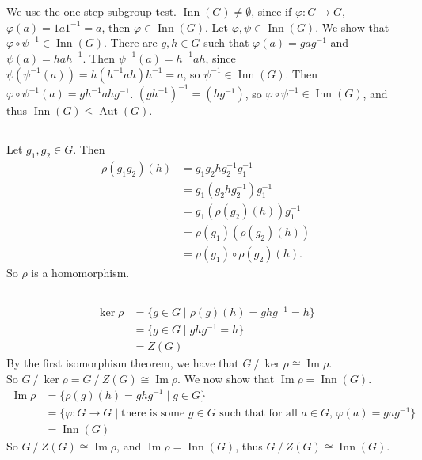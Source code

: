 \documentclass[11pt]{article}
\DeclareMathOperator{\im}{Im}
\DeclareMathOperator{\Inn}{Inn}
\DeclareMathOperator{\Aut}{Aut}
\begin{document}
\section{} %
\subsection{} %
We use the one step subgroup test.
\newline
\newline
$\Inn(G)\neq\emptyset$, since if $\varphi:G\rightarrow G$,
$\varphi(a)=1a1^{-1}=a$, then $\varphi\in\Inn(G)$.
\newline
\newline
Let $\varphi,\psi\in\Inn(G)$. We show that $\varphi\circ\psi^{-1}\in\Inn(G)$.
There are $g,h\in G$ such that $\varphi(a)=gag^{-1}$ and $\psi(a)=hah^{-1}$.
Then $\psi^{-1}(a)=h^{-1}ah$, since $\psi(\psi^{-1}(a))=h(h^{-1}ah)h^{-1}=a$,
so $\psi^{-1}\in\Inn(G)$. Then $\varphi\circ\psi^{-1}(a)=gh^{-1}ahg^{-1}$.
$(gh^{-1})^{-1}=(hg^{-1})$, so $\varphi\circ\psi^{-1}\in\Inn(G)$, and thus
$\Inn(G)\le\Aut(G)$.


\subsection{} %
Let $g_1,g_2\in G$. Then
\begin{align*}
	\rho(g_1g_2)(h)&=g_1g_2hg_2^{-1}g_1^{-1}\\
	&=g_1(g_2hg_2^{-1})g_1^{-1}\\
	&=g_1(\rho(g_2)(h))g_1^{-1}\\
	&=\rho(g_1)(\rho(g_2)(h))\\
	&=\rho(g_1)\circ\rho(g_2)(h).
\end{align*}
So $\rho$ is a homomorphism.


\subsection{} %
\begin{align*}
	\ker\rho&=\{g\in G\mid\rho(g)(h)=ghg^{-1}=h\}\\
	&=\{g\in G\mid ghg^{-1}=h\}\\
	&=Z(G)
\end{align*}
By the first isomorphism theorem, we have that $G\mathbin/\ker\rho\cong\im\rho$.\\
So $G\mathbin/\ker\rho=G\mathbin/Z(G)\cong\im\rho$. We now show that
$\im\rho=\Inn(G)$.
\begin{align*}
	\im\rho&=\{\rho(g)(h)=ghg^{-1}\mid g\in G\}\\
	&=\{\varphi:G\rightarrow G\mid\text{there is some $g\in G$ such that for
		all $a\in G$, }\varphi(a)=gag^{-1}\}\\
	&=\Inn(G)
\end{align*}
So $G\mathbin/Z(G)\cong\im\rho$, and $\im\rho=\Inn(G)$, thus
$G\mathbin/Z(G)\cong\Inn(G)$.
\end{document}
